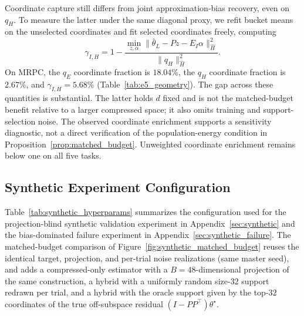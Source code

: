 Coordinate capture still differs from joint approximation-bias recovery, even on $q_H$. To measure the latter under the same diagonal proxy, we refit bucket means on the unselected coordinates and fit selected coordinates freely, computing
\begin{equation}
 \gamma_{I,H}=1-
 \frac{\min_{z,\alpha}\|\bar\theta_L-Pz-E_I\alpha\|_{\hat H}^2}
 {\|q_H\|_{\hat H}^2}.
\end{equation}
On MRPC, the $q_E$ coordinate fraction is $18.04\%$, the $q_H$ coordinate fraction is $2.67\%$, and $\gamma_{I,H}=5.68\%$ (Table~\ref{tab:e5_geometry}). The gap across these quantities is substantial. The latter holds $d$ fixed and is not the matched-budget benefit relative to a larger compressed space; it also omits training and support-selection noise. The observed coordinate enrichment supports a sensitivity diagnostic, not a direct verification of the population-energy condition in Proposition~\ref{prop:matched_budget}. Unweighted coordinate enrichment remains below one on all five tasks.






\subsection{Synthetic Experiment Configuration}

Table~\ref{tab:synthetic_hyperparams} summarizes the configuration used for the projection-blind synthetic validation experiment in Appendix~\ref{sec:synthetic} and the bias-dominated failure experiment in Appendix~\ref{sec:synthetic_failure}.
The matched-budget comparison of Figure~\ref{fig:synthetic_matched_budget} reuses the identical target, projection, and per-trial noise realizations (same master seed), and adds a compressed-only estimator with a $B=48$-dimensional projection of the same construction, a hybrid with a uniformly random size-$32$ support redrawn per trial, and a hybrid with the oracle support given by the top-$32$ coordinates of the true off-subspace residual $(I-PP^\top)\theta^\star$.

